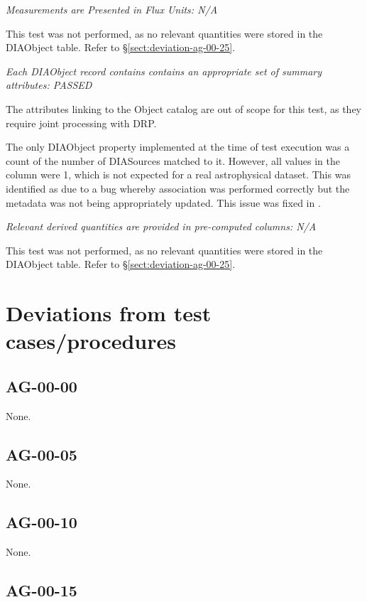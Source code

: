 \documentclass[DM,lsstdraft,STR,toc]{lsstdoc}
\begin{document}
\textit{Measurements are Presented in Flux Units: N/A}

This test was not performed, as no relevant quantities were stored in the DIAObject table. Refer to \S\ref{sect:deviation-ag-00-25}.

\textit{Each DIAObject record contains contains an appropriate set of summary attributes: PASSED}

The attributes linking to the Object catalog are out of scope for this test, as
they require joint processing with DRP.

The only DIAObject property implemented at the time of test execution was a count of the number of DIASources matched to it.
However, all values in the column were 1, which is not expected for a real astrophysical dataset.
This was identified as due to a bug whereby association was performed correctly but the metadata was not being appropriately updated.
This issue was fixed in .

\textit{Relevant derived quantities are provided in pre-computed columns: N/A}

This test was not performed, as no relevant quantities were stored in the DIAObject table. Refer to \S\ref{sect:deviation-ag-00-25}.

\section{Deviations from test cases/procedures}

\subsection{AG-00-00}

None.

\subsection{AG-00-05}
\label{sect:deviation-ag-00-05}

None.

\subsection{AG-00-10}
\label{sect:deviation-ag-00-10}

None.

\subsection{AG-00-15}
\label{sect:deviation-ag-00-15}
\end{document}

